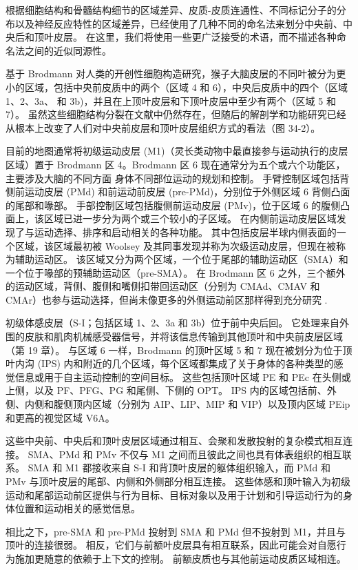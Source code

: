 根据细胞结构和骨髓结构细节的区域差异、皮质-皮质连通性、不同标记分子的分布以及神经反应特性的区域差异，已经使用了几种不同的命名法来划分中央前、中央后和顶叶皮层。 在这里，我们将使用一些更广泛接受的术语，而不描述各种命名法之间的近似同源性。

基于 Brodmann 对人类的开创性细胞构造研究，猴子大脑皮层的不同叶被分为更小的区域，包括中央前皮质中的两个（区域 4 和 6），中央后皮质中的四个（区域 1、2、3a、 和 3b)，并且在上顶叶皮层和下顶叶皮层中至少有两个（区域 5 和 7）。 虽然这些细胞结构分裂在文献中仍然存在，但随后的解剖学和功能研究已经从根本上改变了人们对中央前皮层和顶叶皮层组织方式的看法（图 34-2）。

目前的地图通常将初级运动皮层 (M1)（灵长类动物中最直接参与运动执行的皮层区域）置于 Brodmann 区 4。Brodmann 区 6 现在通常分为五个或六个功能区，主要涉及大脑的不同方面 身体不同部位运动的规划和控制。 手臂控制区域包括背侧前运动皮层 (PMd) 和前运动前皮层 (pre-PMd)，分别位于外侧区域 6 背侧凸面的尾部和喙部。 手部控制区域包括腹侧前运动皮层 (PMv)，位于区域 6 的腹侧凸面上，该区域已进一步分为两个或三个较小的子区域。 在内侧前运动皮层区域发现了与运动选择、排序和启动相关的各种功能。 其中包括皮层半球内侧表面的一个区域，该区域最初被 Woolsey 及其同事发现并称为次级运动皮层，但现在被称为辅助运动区。 该区域又分为两个区域，一个位于尾部的辅助运动区（SMA）和一个位于喙部的预辅助运动区（pre-SMA）。 在 Brodmann 区 6 之外，三个额外的运动区域，背侧、腹侧和嘴侧扣带回运动区（分别为 CMAd、CMAV 和 CMAr）也参与运动选择，但尚未像更多的外侧运动前区那样得到充分研究 .

初级体感皮层（S-I；包括区域 1、2、3a 和 3b）位于前中央后回。 它处理来自外围的皮肤和肌肉机械感受器信号，并将该信息传输到其他顶叶和中央前皮层区域（第 19 章）。 与区域 6 一样，Brodmann 的顶叶区域 5 和 7 现在被划分为位于顶叶内沟 (IPS) 内和附近的几个区域，每个区域都集成了关于身体的各种类型的感觉信息或用于自主运动控制的空间目标。 这些包括顶叶区域 PE 和 PEc 在头侧或上侧，以及 PF、PFG、PG 和尾侧、下侧的 OPT。 IPS 内的区域包括前、外侧、内侧和腹侧顶内区域（分别为 AIP、LIP、MIP 和 VIP）以及顶内区域 PEip 和更高的视觉区域 V6A。

这些中央前、中央后和顶叶皮层区域通过相互、会聚和发散投射的复杂模式相互连接。 SMA、PMd 和 PMv 不仅与 M1 之间而且彼此之间也具有体表组织的相互联系。 SMA 和 M1 都接收来自 S-I 和背顶叶皮层的躯体组织输入，而 PMd 和 PMv 与顶叶皮层的尾部、内侧和外侧部分相互连接。 这些体感和顶叶输入为初级运动和尾部运动前区提供与行为目标、目标对象以及用于计划和引导运动行为的身体位置和运动相关的感觉信息。

相比之下，pre-SMA 和 pre-PMd 投射到 SMA 和 PMd 但不投射到 M1，并且与顶叶的连接很弱。 相反，它们与前额叶皮层具有相互联系，因此可能会对自愿行为施加更随意的依赖于上下文的控制。 前额皮质也与其他前运动皮质区域相连。

